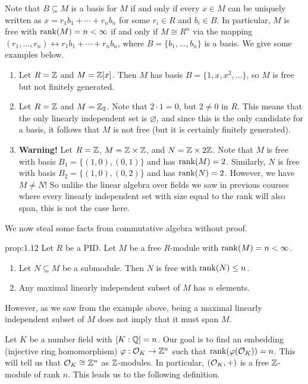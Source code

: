 Note that $B \subseteq M$ is a basis for $M$ if and only if every $x \in M$ 
can be uniquely written as $x = r_1 b_1 + \cdots + r_n b_n$ for some 
$r_i \in R$ and $b_i \in B$. In particular, $M$ is free with 
$\operatorname{rank}(M) = n < \infty$ if and only if $M \cong R^n$ via the mapping 
$(r_1, \dots, r_n) \leftrightarrow r_1 b_1 + \cdots + r_n b_n$, where 
$B = \{b_1, \dots, b_n\}$ is a basis. We give some examples below.
\begin{enumerate}[(1)]
    \item Let $R = \mathbb{Z}$ and $M = \mathbb{Z}[x]$. Then $M$ has basis $B = 
    \{1, x, x^2, \dots\}$, so $M$ is free but not finitely generated. 
    \item Let $R = \mathbb{Z}$ and $M = \mathbb{Z}_2$. Note that $2 \cdot 1 = 0$, but 
    $2 \neq 0$ in $R$. This means that the only linearly independent 
    set is $\varnothing$, and since this is the only candidate for a 
    basis, it follows that $M$ is not free (but it is certainly 
    finitely generated).
    \item {\bf Warning!} Let $R = \mathbb{Z}$, $M = \mathbb{Z} \times \mathbb{Z}$, and $N = 
    \mathbb{Z} \times 2\mathbb{Z}$. Note that $M$ is free with basis 
    $B_1 = \{(1, 0), (0, 1)\}$ and has $\operatorname{rank}(M) = 2$. Similarly, 
    $N$ is free with basis $B_2 = \{(1, 0), (0, 2)\}$ and has 
    $\operatorname{rank}(N) = 2$. However, we have $M \neq N$! So unlike the linear 
    algebra over fields we saw in previous courses where every linearly independent set 
    with size equal to the rank will also span, this is not the case here. 
\end{enumerate}
We now steal some facts from commutative algebra without proof. 

\begin{prop}{prop:1.12}
    Let $R$ be a PID. Let $M$ be a free $R$-module with $\operatorname{rank}(M) = n < \infty$. 
    \begin{enumerate}[(1)]
        \item Let $N \subseteq M$ be a submodule. Then $N$ is free with $\operatorname{rank}(N) \leq n$. 
        \item Any maximal linearly independent subset of $M$ has $n$ elements. 
    \end{enumerate}
\end{prop}\vspace{-0.25cm}

However, as we saw from the example above, being a maximal linearly 
independent subset of $M$ does not imply that it must span $M$.

Let $K$ be a number field with $[K : \mathbb{Q}] = n$. Our goal is to find 
an embedding (injective ring homomorphism) $\varphi : {\cal O}_K \to \mathbb{Z}^n$ 
such that $\operatorname{rank}(\varphi({\cal O}_K)) = n$. This will tell us that 
${\cal O}_K \cong \mathbb{Z}^n$ as $\mathbb{Z}$-modules. In particular, $({\cal O}_K, +)$ 
is a free $\mathbb{Z}$-module of rank $n$. This leads us to the following definition. 

